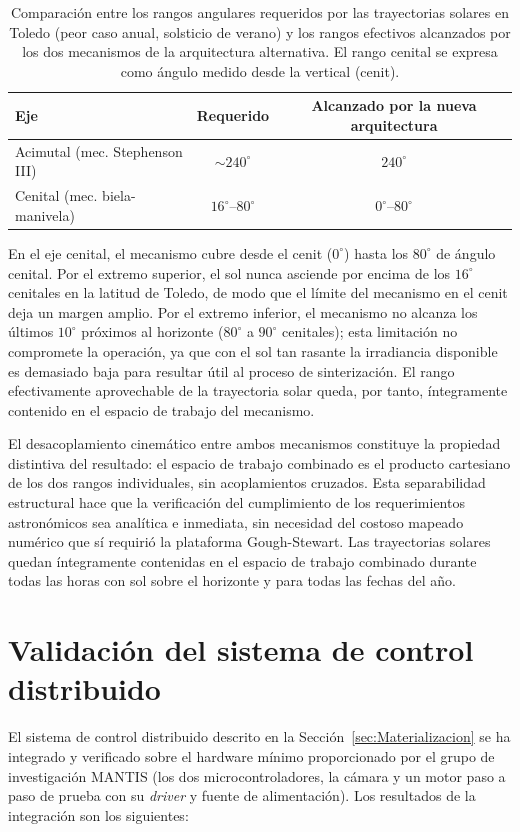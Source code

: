 \begin{table}[htbp]
    \centering
    \begin{tabular}{lcc}
        \toprule
        \textbf{Eje} & \textbf{Requerido} & \textbf{Alcanzado por la nueva arquitectura} \\
        \midrule
        Acimutal (mec. Stephenson III) & $\sim 240^{\circ}$  & $240^{\circ}$ \\
        Cenital (mec. biela-manivela)  & $16^{\circ}$--$80^{\circ}$ & $0^{\circ}$--$80^{\circ}$ \\
        \bottomrule
    \end{tabular}
    \caption{Comparación entre los rangos angulares requeridos por las 
    trayectorias solares en Toledo (peor caso anual, solsticio de 
    verano) y los rangos efectivos alcanzados por los dos mecanismos 
    de la arquitectura alternativa. El rango cenital se expresa como 
    ángulo medido desde la vertical (cenit).}
    \label{tab:res_mantis}
\end{table}

En el eje cenital, el mecanismo cubre desde el cenit ($0^{\circ}$) hasta los $80^{\circ}$ de ángulo cenital. Por el extremo superior, el sol nunca asciende por encima de los $16^{\circ}$ cenitales en la latitud de Toledo, de modo que el límite del mecanismo en el cenit deja un margen amplio. Por el extremo inferior, el mecanismo no alcanza los últimos $10^{\circ}$ próximos al horizonte ($80^{\circ}$ a $90^{\circ}$ cenitales); esta limitación no compromete la operación, ya que con el sol tan rasante la irradiancia disponible es demasiado baja para resultar útil al proceso de sinterización. El rango efectivamente aprovechable de la trayectoria solar queda, por tanto, íntegramente contenido en el espacio de trabajo del mecanismo.

El desacoplamiento cinemático entre ambos mecanismos constituye la propiedad distintiva del resultado: el espacio de trabajo combinado es el producto cartesiano de los dos rangos individuales, sin acoplamientos cruzados. Esta separabilidad estructural hace que la verificación del cumplimiento de los requerimientos astronómicos sea analítica e inmediata, sin necesidad del costoso mapeado numérico que sí requirió la plataforma Gough-Stewart. Las trayectorias solares quedan íntegramente contenidas en el espacio de trabajo combinado durante todas las horas con sol sobre el horizonte y para todas las fechas del año.

\section{Validación del sistema de control distribuido}
\label{sec:res_control}
El sistema de control distribuido descrito en la Sección~\ref{sec:Materializacion} se ha integrado y verificado sobre el hardware mínimo proporcionado por el grupo de investigación MANTIS (los dos microcontroladores, la cámara y un motor paso a paso de prueba con su \emph{driver} y fuente de alimentación). Los resultados de la integración son los siguientes:

